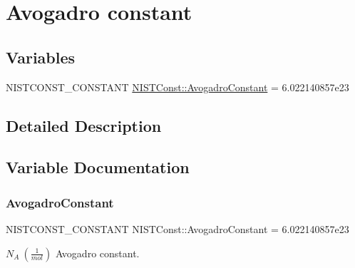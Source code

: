 \hypertarget{group___n_i_s_t_const-_avogadro_constant}{}\section{Avogadro constant}
\label{group___n_i_s_t_const-_avogadro_constant}
\subsection*{Variables}
\begin{DoxyCompactItemize}
\item 
N\+I\+S\+T\+C\+O\+N\+S\+T\+\_\+\+C\+O\+N\+S\+T\+A\+NT \mbox{\hyperlink{group___n_i_s_t_const-_avogadro_constant_ga6bfa56f26d113ff9445c87ab17462e8a}{N\+I\+S\+T\+Const\+::\+Avogadro\+Constant}} = 6.\+022140857e23
\end{DoxyCompactItemize}


\subsection{Detailed Description}


\subsection{Variable Documentation}
\mbox{\label{group___n_i_s_t_const-_avogadro_constant_ga6bfa56f26d113ff9445c87ab17462e8a}} 
\subsubsection{\texorpdfstring{Avogadro\+Constant}{AvogadroConstant}}
{\footnotesize\ttfamily N\+I\+S\+T\+C\+O\+N\+S\+T\+\_\+\+C\+O\+N\+S\+T\+A\+NT N\+I\+S\+T\+Const\+::\+Avogadro\+Constant = 6.\+022140857e23}

$N_A \ (\frac{1}{mol})$ Avogadro constant. 